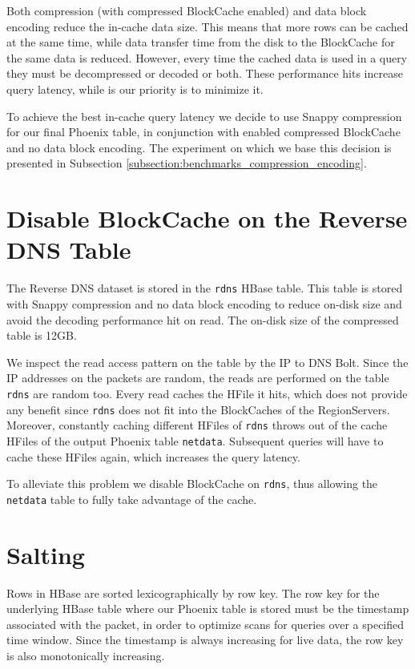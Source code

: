 Both compression (with compressed BlockCache enabled) and data block encoding reduce the in-cache data size. This means that more rows can be cached at the same time, while data transfer time from the disk to the BlockCache for the same data is reduced. However, every time the cached data is used in a query they must be decompressed or decoded or both. These performance hits increase query latency, while is our priority is to minimize it.

To achieve the best in-cache query latency we decide to use Snappy compression for our final Phoenix table, in conjunction with enabled compressed BlockCache and no data block encoding. The experiment on which we base this decision is presented in Subsection \ref{subsection:benchmarks_compression_encoding}.


\section{Disable BlockCache on the Reverse DNS Table}

The Reverse DNS dataset is stored in the \texttt{rdns} HBase table. This table is stored with Snappy compression and no data block encoding to reduce on-disk size and avoid the decoding performance hit on read. The on-disk size of the compressed table is 12GB.

We inspect the read access pattern on the table by the IP to DNS Bolt. Since the IP addresses on the packets are random, the reads are performed on the table \texttt{rdns} are random too. Every read caches the HFile it hits, which does not provide any benefit since \texttt{rdns} does not fit into the BlockCaches of the RegionServers. Moreover, constantly caching different HFiles of \texttt{rdns} throws out of the cache HFiles of the output Phoenix table \texttt{netdata}. Subsequent queries will have to cache these HFiles again, which increases the query latency.

To alleviate this problem we disable BlockCache on \texttt{rdns}, thus allowing the \texttt{netdata} table to fully take advantage of the cache.


\section{Salting}\label{section:optimizations_salting}

Rows in HBase are sorted lexicographically by row key. The row key for the underlying HBase table where our Phoenix table is stored must be the timestamp associated with the packet, in order to optimize scans for queries over a specified time window. Since the timestamp is always increasing for live data, the row key is also monotonically increasing.

